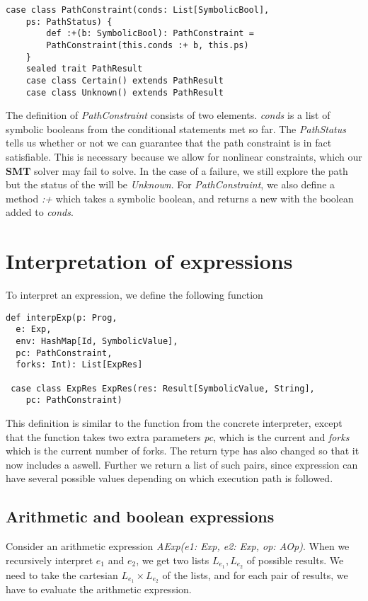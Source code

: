 \begin{lstlisting}[style=simple]
case class PathConstraint(conds: List[SymbolicBool],
	ps: PathStatus) {
		def :+(b: SymbolicBool): PathConstraint = 
		PathConstraint(this.conds :+ b, this.ps)
	}
	sealed trait PathResult
	case class Certain() extends PathResult
	case class Unknown() extends PathResult
\end{lstlisting}

The definition of \textsl{PathConstraint} consists of two elements. \textsl{conds} is a  list of symbolic booleans from the conditional statements met so far. The \textsl{PathStatus} tells us whether or not we can guarantee that the path constraint is in fact satisfiable. This is necessary because we allow for nonlinear constraints, which our \textbf{SMT} solver may fail to solve. In the case of a failure, we still explore the path but the status of the \pc will be \textsl{Unknown}. For \textsl{PathConstraint}, we also define a method \textsl{:+} which takes a symbolic boolean, and returns a new \pc with the boolean added to \textsl{conds}. 

\section{Interpretation of expressions}
To interpret an expression, we define the following function

\begin{lstlisting}[style = simple]
 def interpExp(p: Prog,
  e: Exp, 
  env: HashMap[Id, SymbolicValue],
  pc: PathConstraint, 
  forks: Int): List[ExpRes]
  
 case class ExpRes ExpRes(res: Result[SymbolicValue, String], 
 	pc: PathConstraint)
\end{lstlisting}
This definition is similar to the function from the concrete interpreter, except that the function takes two extra parameters \textsl{pc}, which is the current \pc and \textsl{forks} which is the current number of forks. The return type has also changed so that it now includes a \pc aswell. Further we return a list of such pairs, since expression can have several possible values depending on which execution path is followed. 

\subsection{Arithmetic and boolean expressions}
Consider an arithmetic expression 
\textsl{AExp(e1: Exp, e2: Exp, op: AOp)}. When we recursively interpret $e_1$ and $e_2$, we get two lists $L_{e_1}, L_{e_2}$ of possible results. We need to take the cartesian $L_{e_1} \times L_{e_2}$ of the lists, and for each pair of results, we have to evaluate the arithmetic expression. 

